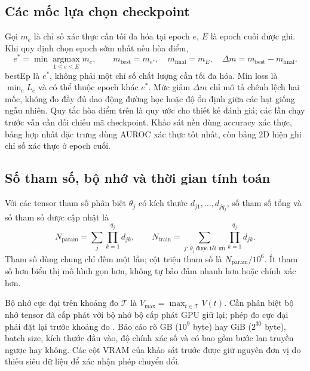 \subsection{Các mốc lựa chọn checkpoint}
Gọi $m_e$ là chỉ số xác thực cần tối đa hóa tại epoch $e$, $E$ là epoch
cuối được ghi. Khi quy định chọn epoch sớm nhất nếu hòa điểm,
\begin{equation}
 e^*=\min\operatorname*{argmax}_{1\leq e\leq E}m_e,\qquad
 m_{\mathrm{best}}=m_{e^*},\quad m_{\mathrm{final}}=m_E,\quad
 \Delta m=m_{\mathrm{best}}-m_{\mathrm{final}}.
 \label{eq:metric-checkpoint}
\end{equation}
bestEp là $e^*$, không phải một chỉ số chất lượng cần tối đa hóa.
Min loss là $\min_e L_e$ và có thể thuộc epoch khác $e^*$.
Mức giảm $\Delta m$ chỉ mô tả chênh lệch hai mốc, không đo đầy đủ dao
động đường học hoặc độ ổn định giữa các hạt giống ngẫu nhiên. Quy tắc hòa điểm trên là quy
ước cho thiết kế đánh giá; các lần chạy trước vẫn cần đối chiếu mã checkpoint.
Khảo sát nền dùng accuracy xác thực, bảng hợp nhất đặc trưng dùng AUROC xác thực
tốt nhất, còn bảng 2D hiện ghi chỉ số xác thực ở epoch cuối.

\subsection{Số tham số, bộ nhớ và thời gian tính toán}
Với các tensor tham số phân biệt $\theta_j$ có kích thước $d_{j1},\ldots,d_{jq_j}$,
số tham số tổng và số tham số được cập nhật là
\begin{equation}
 N_{\mathrm{param}}=\sum_j\prod_{k=1}^{q_j}d_{jk},\qquad
 N_{\mathrm{train}}=\sum_{j:\,\theta_j\ \text{được tối ưu}}\prod_{k=1}^{q_j}d_{jk}.
 \label{eq:metric-parameters}
\end{equation}
Tham số dùng chung chỉ đếm một lần; cột triệu tham số là
$N_{\mathrm{param}}/10^6$. Ít tham số hơn biểu thị mô hình gọn hơn,
không tự bảo đảm nhanh hơn hoặc chính xác hơn.

Bộ nhớ cực đại trên khoảng đo $\mathcal T$ là
$V_{\max}=\max_{t\in\mathcal T}V(t)$. Cần phân biệt bộ nhớ tensor đã
cấp phát với bộ nhớ bộ cấp phát GPU giữ lại; phép đo cực đại phải đặt
lại trước khoảng đo \cite{pytorchMemoryMetric}. Báo cáo rõ GB
($10^9$ byte) hay GiB ($2^{30}$ byte), batch size, kích thước đầu vào,
độ chính xác số và có bao gồm bước lan truyền ngược hay không.
Các cột VRAM của khảo sát trước được giữ nguyên đơn vị do thiếu siêu dữ liệu để xác nhận phép chuyển đổi.

